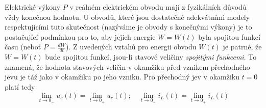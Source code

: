     Elektrické výkony $P$ v reálném elektrickém obvodu mají z fyzikálních důvodů vždy konečnou 
    hodnotu. U obvodů, které jsou dostatečně adekvátními modely respektujícími tuto skutečnost 
    (nazýváme je obvody s konečnými výkony) je to postačující podmínkou pro to, aby jejich energie 
    $W = W(t)$ byla spojitou funkcí času (neboť $P = \frac{dW}{dt}$). Z uvedených vztahů pro energii 
    obvodu $W(t)$ je patrné, že $W = W(t)$ bude spojitou funkcí, jsou-li stavové veličiny 
    \emph{spojitými funkcemi}. To znamená, že hodnota stavových veličin v okamžiku před vznikem 
    přechodného jevu je táž jako v okamžiku po jeho vzniku. Pro přechodný jev v okamžiku $t=0$ platí 
    tedy
    \begin{equation}\label{TEO:eq_spojite_fce}
      \lim_{t\rightarrow0_-}u_c(t)= \lim_{t\rightarrow0_+}u_c(t); \quad  
      \lim_{t\rightarrow0_-}i_L(t)= \lim_{t\rightarrow0_+}i_L(t)
    \end{equation}

